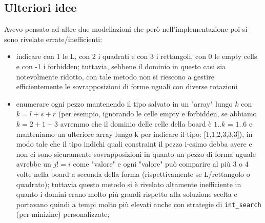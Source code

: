 \documentclass{article}
\begin{document}
\subsection{Ulteriori idee}
Avevo pensato ad altre due modellazioni che però nell'implementazione poi si sono rivelate errate/inefficienti:
\begin{itemize}
    \item indicare con 1 le L, con 2 i quadrati e con 3 i rettangoli, con 0 le empty cells e con -1 i forbidden; tuttavia, sebbene il dominio in questo casi sia notevolmente ridotto, con tale metodo non si riescono a gestire efficientemente le sovrapposizioni di forme uguali con diverse rotazioni
    \item enumerare ogni pezzo mantenendo il tipo salvato in un "array" lungo $k$ con $k=l+s+r$ (per esempio, ignorando le celle empty e forbidden, se abbiamo $k=2+1+3$ avremmo che il dominio delle celle della board è $1..k$ = $1..6$ e manteniamo un ulteriore array lungo k per indicare il tipo: [1,1,2,3,3,3]), in modo tale che il tipo indichi quali constraint il pezzo i-esimo debba avere e non ci sono sicuramente sovrapposizioni in quanto un pezzo di forma uguale avrebbe un $j!=i$ come "valore" e ogni "valore" può comparire al più 3 o 4 volte nella board a seconda della forma (rispettivamente se L/rettangolo o quadrato); tuttavia questo metodo si è rivelato altamente inefficiente in quanto i domini erano molto più grandi rispetto alla soluzione scelta e portavano quindi a tempi molto più elevati anche con strategie di \texttt{int\_search} (per minizinc) personalizzate;
\end{itemize}
\end{document}
